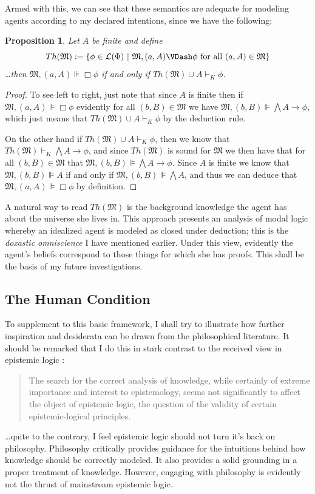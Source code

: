 \documentclass[11pt]{article}
\numberwithin{equation}{subsection}
\newtheorem{prop}[theorem]{Proposition}
\renewcommand{\Omega}{\mathfrak{M}}
\begin{document}
Armed with this, we can see that these semantics are adequate for modeling agents according to my declared intentions, since we have the following:
\begin{prop}\label{central-prop}
 Let $A$ be finite and define $$Th(\Omega) := \{ \phi \in \mathcal{L}(\Phi) \ |\ \Omega, (a,A) \VDash \phi \textup{ for all $(a,A) \in \Omega$\}}$$
\ldots then $\Omega, (a,A) \VDash \Box \phi$ if and only if $Th(\Omega) \cup A \vdash_K \phi$.
\end{prop}
\begin{proof}
 To see left to right, just note that since $A$ is finite then if $\Omega, (a,A) \VDash \Box \phi$ evidently for all $(b,B)\in \Omega$ we have $\Omega, (b,B) \VDash \bigwedge A \to \phi$, which just means that $Th(\Omega) \cup A \vdash_K \phi$ by the deduction rule.

On the other hand if $Th(\Omega) \cup A \vdash_K \phi$, then we know that $Th(\Omega) \vdash_K \bigwedge A \to \phi$, and since $Th(\Omega)$ is sound for $\Omega$ we then have that for all $(b,B) \in \Omega$ that $\Omega,(b,B)\VDash \bigwedge A \to \phi$.  Since $A$ is finite we know that  $\Omega,(b,B) \VDash A$ if and only if $\Omega,(b,B) \VDash \bigwedge A$, and thus we can deduce that $\Omega,(a,A)\VDash \Box \phi$ by definition.
\end{proof}

A natural way to read $Th(\Omega)$ is the background knowledge the agent has about the universe she lives in.  This approach presents an analysis of modal logic whereby an idealized agent is modeled as closed under deduction; this is the \emph{doxastic omniscience} I have mentioned earlier. Under this view, evidently the agent's beliefs correspond to those things for which she has proofs.  This shall be the basis of my future investigations.

\subsection{The Human Condition}\label{Human-Condition}
To supplement to this basic framework, I shall try to illustrate how
further inspiration and desiderata can be drawn from the philosophical
literature.  It should be remarked that I do this in stark contrast to
the received view in epistemic logic
\citep[pg. 34]{lenzen_recent_1978}:
\begin{quote}
The search for the correct analysis of knowledge, while certainly of
extreme importance and interest to epistemology, seems not
significantly to affect the object of epistemic logic, the question of
the validity of certain epistemic-logical principles.
\end{quote}
\ldots quite to the contrary, I feel epistemic logic should not turn
it's back on philosophy. Philosophy critically provides guidance for
the intuitions behind how knowledge should be correctly modeled.  It
also provides a solid grounding in a proper treatment of knowledge.
However, engaging with philosophy is evidently not the thrust of
mainstream epistemic logic.
\end{document}
